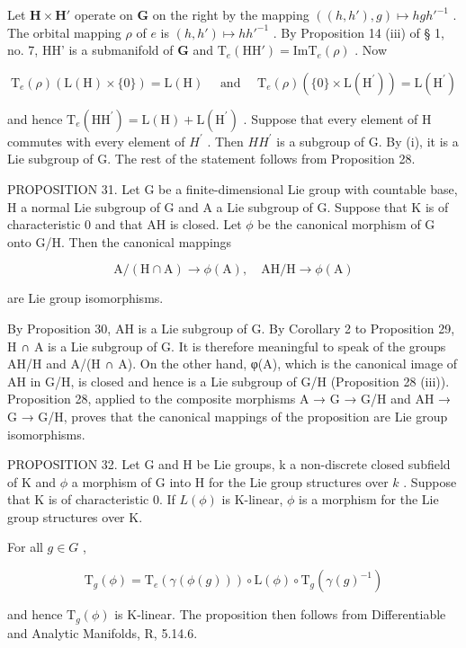 Let \(\mathbf{H} \times \mathbf{H}'\) operate on \(\mathbf{G}\) on the right by the mapping \(((h, h'), g) \mapsto hgh'^{-1}\) . The orbital mapping \(\rho\) of \(e\) is \((h, h') \mapsto hh'^{-1}\) . By Proposition 14 (iii) of § 1, no. 7, HH' is a submanifold of \(\mathbf{G}\) and \(\mathrm{T}_e(\mathrm{HH}') = \mathrm{Im} \mathrm{T}_e(\rho)\) . Now

\[
\mathrm{T} _ {e} (\rho) (\mathrm{L} (\mathrm{H}) \times \{0 \}) = \mathrm{L} (\mathrm{H}) \quad \text { and } \quad \mathrm{T} _ {e} (\rho) (\{0 \} \times \mathrm{L} (\mathrm{H} ^ {\prime})) = \mathrm{L} (\mathrm{H} ^ {\prime})
\]

and hence \(\mathrm{T}_{e}(\mathrm{HH}^{\prime})=\mathrm{L}(\mathrm{H})+\mathrm{L}(\mathrm{H}^{\prime})\) . Suppose that every element of H commutes with every element of \(H^{\prime}\) . Then \(HH^{\prime}\) is a subgroup of G. By (i), it is a Lie subgroup of G. The rest of the statement follows from Proposition 28.

PROPOSITION 31. Let G be a finite-dimensional Lie group with countable base, H a normal Lie subgroup of G and A a Lie subgroup of G. Suppose that K is of characteristic 0 and that AH is closed. Let \(\phi\) be the canonical morphism of G onto G/H. Then the canonical mappings

\[
\mathrm{A} / (\mathrm{H} \cap \mathrm{A}) \rightarrow \phi (\mathrm{A}), \quad \mathrm{AH} / \mathrm{H} \rightarrow \phi (\mathrm{A})
\]

are Lie group isomorphisms.

By Proposition 30, AH is a Lie subgroup of G. By Corollary 2 to Proposition 29, H ∩ A is a Lie subgroup of G. It is therefore meaningful to speak of the groups AH/H and A/(H ∩ A). On the other hand, φ(A), which is the canonical image of AH in G/H, is closed and hence is a Lie subgroup of G/H (Proposition 28 (iii)). Proposition 28, applied to the composite morphisms A → G → G/H and AH → G → G/H, proves that the canonical mappings of the proposition are Lie group isomorphisms.

PROPOSITION 32. Let G and H be Lie groups, k a non-discrete closed subfield of K and \(\phi\) a morphism of G into H for the Lie group structures over \(k\) . Suppose that K is of characteristic 0. If \(L(\phi)\) is K-linear, \(\phi\) is a morphism for the Lie group structures over K.

For all \(g \in G\) ,

\[
\mathrm{T} _ {g} (\phi) = \mathrm{T} _ {e} (\gamma (\phi (g))) \circ \mathrm{L} (\phi) \circ \mathrm{T} _ {g} (\gamma (g) ^ {- 1})
\]

and hence \(\mathrm{T}_g(\phi)\) is K-linear. The proposition then follows from Differentiable and Analytic Manifolds, R, 5.14.6.

